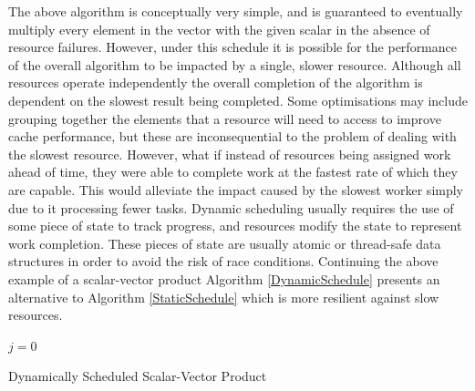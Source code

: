 \documentclass[12pt]{article}
\begin{document}
The above algorithm is conceptually very simple, and is guaranteed to eventually multiply every element in the vector with the given scalar in the absence of resource failures.
\newline
However, under this schedule it is possible for the performance of the overall algorithm to be impacted by a single, slower resource. Although all resources operate independently the overall completion of the algorithm is dependent on the slowest result being completed.
\newline
Some optimisations may include grouping together the elements that a resource will need to access to improve cache performance, but these are inconsequential to the problem of dealing with the slowest resource.
\newline
However, what if instead of resources being assigned work ahead of time, they were able to complete work at the fastest rate of which they are capable. This would alleviate the impact caused by the slowest worker simply due to it processing fewer tasks.
\newline
\newline
Dynamic scheduling usually requires the use of some piece of state to track progress, and resources modify the state to represent work completion. These pieces of state are usually atomic or thread-safe data structures in order to avoid the risk of race conditions.
\newline
Continuing the above example of a scalar-vector product Algorithm \ref{DynamicSchedule} presents an alternative to Algorithm \ref{StaticSchedule} which is more resilient against slow resources.
\newline

\IncMargin{1em}
\begin{algorithm}[H]
 \BlankLine

 $j = 0$\;
 \caption{Dynamically Scheduled Scalar-Vector Product}
 \label{DynamicSchedule}
\end{algorithm}
\DecMargin{1em}
\medskip
\end{document}
